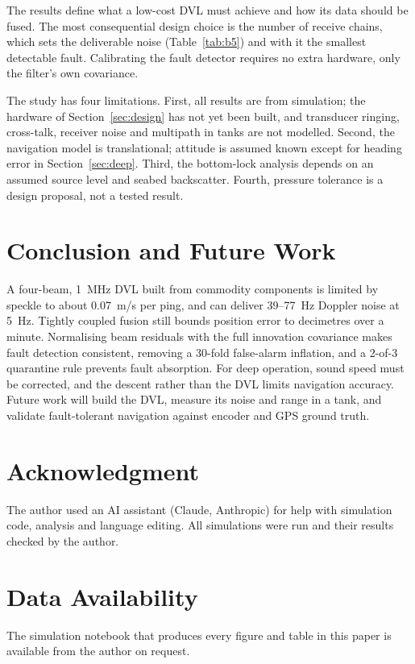 \documentclass[conference]{IEEEtran}
\begin{document}
The results define what a low-cost DVL must achieve and how its data should be fused. The most consequential design choice is the number of receive chains, which sets the deliverable noise (Table~\ref{tab:b5}) and with it the smallest detectable fault. Calibrating the fault detector requires no extra hardware, only the filter's own covariance.

The study has four limitations. First, all results are from simulation; the hardware of Section~\ref{sec:design} has not yet been built, and transducer ringing, cross-talk, receiver noise and multipath in tanks are not modelled. Second, the navigation model is translational; attitude is assumed known except for heading error in Section~\ref{sec:deep}. Third, the bottom-lock analysis depends on an assumed source level and seabed backscatter. Fourth, pressure tolerance is a design proposal, not a tested result.

\section{Conclusion and Future Work}

A four-beam, 1~MHz DVL built from commodity components is limited by speckle to about 0.07~m/s per ping, and can deliver 39--77~Hz Doppler noise at 5~Hz. Tightly coupled fusion still bounds position error to decimetres over a minute. Normalising beam residuals with the full innovation covariance makes fault detection consistent, removing a 30-fold false-alarm inflation, and a 2-of-3 quarantine rule prevents fault absorption. For deep operation, sound speed must be corrected, and the descent rather than the DVL limits navigation accuracy. Future work will build the DVL, measure its noise and range in a tank, and validate fault-tolerant navigation against encoder and GPS ground truth.

\section*{Acknowledgment}
The author used an AI assistant (Claude, Anthropic) for help with simulation code, analysis and language editing. All simulations were run and their results checked by the author.

\section*{Data Availability}
The simulation notebook that produces every figure and table in this paper is available from the author on request.
\end{document}
